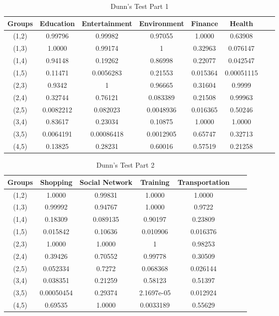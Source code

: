 \begin{table}[h!]
  \centering
  \caption{Dunn's Test Part 1}
  \label{tab:dunn_c}
  \begin{tabular}{cccccccc}
    \toprule
     Groups & Education & Entertainment & Environment & Finance & Health  \\
    \midrule
    (1,2)&0.99796&0.99982&0.97055&1.0000&0.63908\\
(1,3)&1.0000&0.99174&1&0.32963&0.076147\\
(1,4)&0.94148&0.19262&0.86998&0.22077&0.042547\\
(1,5)&0.11471&0.0056283&0.21553&0.015364&0.00051115\\
(2,3)&0.9342&1&0.96665&0.31604&0.9999\\
(2,4)&0.32744&0.76121&0.083389&0.21508&0.99963\\
(2,5)&0.0082212&0.082023&0.0048936&0.016365&0.50246\\
(3,4)&0.83617&0.23034&0.10875&1.0000&1.0000\\
(3,5)&0.0064191&0.00086418&0.0012905&0.65747&0.32713\\
(4,5)&0.13825&0.28231&0.60016&0.57519&0.21258\\
    \bottomrule
  \end{tabular}
\end{table}

\begin{table}[h!]
  \centering
  \caption{Dunn's Test Part 2}
  \label{tab:dunn_c1}
  \begin{tabular}{ccccccc}
    \toprule
     Groups & Shopping & Social Network & Training & Transportation  \\
    \midrule
(1,2) &1.0000&0.99831&1.0000&1.0000\\
(1,3)&0.99992&0.94767&1.0000&0.9722\\
(1,4)&0.18309&0.089135&0.90197&0.23809\\
(1,5)&0.015842&0.10636&0.010906&0.016376\\
(2,3)&1.0000&1.0000&1&0.98253\\
(2,4)&0.39426&0.70552&0.99778&0.30509\\
(2,5)&0.052334&0.7272&0.068368&0.026144\\
(3,4)&0.038351&0.21259&0.58123&0.51397\\
(3,5)&0.00050454&0.29374&2.1697e-05&0.012924\\
(4,5)&0.69535&1.0000&0.0033189&0.55629\\
  \end{tabular}
\end{table} 

